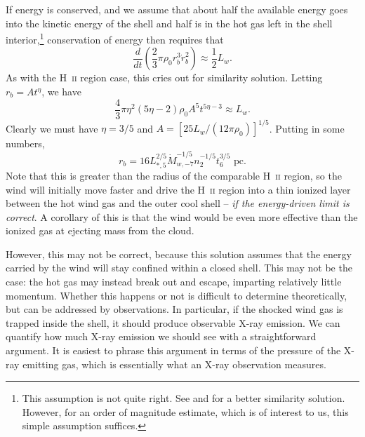 If energy is conserved, and we assume that about half the available energy goes into the kinetic energy of the shell and half is in the hot gas left in the shell interior,\footnote{This assumption is not quite right. See \citet{castor75a} and \citet{weaver77a} for a better similarity solution. However, for an order of magnitude estimate, which is of interest to us, this simple assumption suffices.} conservation of energy then requires that
\begin{equation}
\frac{d}{dt} \left(\frac{2}{3}\pi \rho_0 r_b^3 \dot{r}_b^2\right) \approx \frac{1}{2} L_w.
\end{equation}
As with the H~\textsc{ii} region case, this cries out for similarity solution. Letting $r_b = A t^\eta$, we have
\begin{equation}
\frac{4}{3} \pi \eta^2 (5\eta-2) \rho_0 A^5 t^{5\eta-3} \approx L_w.
\end{equation}
Clearly we must have $\eta=3/5$ and $A=[25 L_w/(12\pi \rho_0)]^{1/5}$. Putting in some numbers,
\begin{equation}
r_b = 16 L_{*,5}^{2/5} \dot{M}_{w,-7}^{-1/5} n_2^{-1/5} t_6^{3/5}\mbox{ pc}.
\end{equation}
Note that this is greater than the radius of the comparable H~\textsc{ii} region, so the wind will initially move faster and drive the H~\textsc{ii} region into a thin ionized layer between the hot wind gas and the outer cool shell -- {\it if the energy-driven limit is correct}. A corollary of this is that the wind would be even more effective than the ionized gas at ejecting mass from the cloud.

However, this may not be correct, because this solution assumes that the energy carried by the wind will stay confined within a closed shell. This may not be the case: the hot gas may instead break out and escape, imparting relatively little momentum. Whether this happens or not is difficult to determine theoretically, but can be addressed by observations. In particular, if the shocked wind gas is trapped inside the shell, it should produce observable X-ray emission. We can quantify how much X-ray emission we should see with a straightforward argument. It is easiest to phrase this argument in terms of the pressure of the X-ray emitting gas, which is essentially what an X-ray observation measures.

